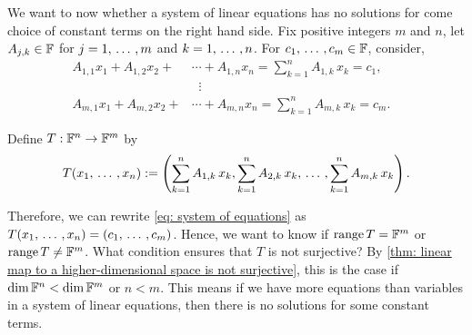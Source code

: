 \begin{prf} We want to now whether a system of linear equations has no solutions for come choice of constant terms on the right hand side. Fix positive integers $m$ and $n$, let $A_{j,k} \in \mathbb{F}$ for $j = 1, {\, \ldots \,\,}, m$ and $k = 1, {\, \ldots \,\,}, n$. For $c_1, {\, \ldots \,\,}, c_m \in \mathbb{F}$, consider,
  \begin{equation}
    \label{eq: system of equations}
    \begin{aligned}
      A_{1,1}x_1 + A_{1,2}x_2 + &\cdots + A_{1,n}x_n = \sum_{k=1}^n A_{1,k}\,x_k = c_1,\\
      &\; \; \vdots & \\
      A_{m,1}x_1 + A_{m,2}x_2 + &\cdots + A_{m,n}x_n = \sum_{k=1}^n A_{m,k}\,x_k = c_m.
    \end{aligned}
  \end{equation}

  Define $T: \mathbb{F}^n \to \mathbb{F}^m$ by
  \begin{equation}
    T(x_1, {\, \ldots \,\,}, x_n) := \left(\sum_{k=1}^n A_{1,k}\,x_k,\sum_{k=1}^n A_{2,k}\,x_k, {\, \ldots \,\,}, \sum_{k=1}^n A_{m,k}\,x_k \right).
  \end{equation}

  Therefore, we can rewrite \eqref{eq: system of equations} as $T(x_1, {\, \ldots \,\,}, x_n) = (c_1, {\, \ldots \,\,}, c_m)$. Hence, we want to know if $\operatorname{range} T = \mathbb{F}^m$ or $\operatorname{range} T \neq \mathbb{F}^m$. What condition ensures that $T$ is not surjective? By \ref{thm: linear map to a higher-dimensional space is not surjective}, this is the case if $\dim \mathbb{F}^n < \dim \mathbb{F}^m$ or $n<m$. This means if we have more equations than variables in a system of linear equations, then there is no solutions for some constant terms.
\end{prf}
